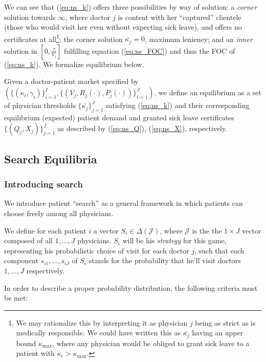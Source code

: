 \documentclass{article}
\begin{document}
We can see that (\ref{eq:ns_k}) offers three possibilities by way of solution: a \textit{corner} solution towards $\infty$, where doctor $j$ is content with her ``captured'' clientele (those who would visit her even without expecting sick leave), and offers no certificates at all\footnote{We may rationalize this by interpreting it as physician $j$ being as strict as is medically responsible. We could have written this as $\bar{\kappa_j}$ having an upper bound $\kappa_{\operatorname{max}}$, where any physician would be obliged to grant sick leave to a patient with $\kappa_i > \kappa_{\operatorname{max}}$.}; the corner solution $\bar{\kappa_j} = 0$, maximum leniency; and an \textit{inner} solution in $[0,\frac{\tau}{V_j}]$ fulfilling equation (\ref{eq:ns_FOC}) and thus the FOC of (\ref{eq:ns_k}). We formalize equilibrium below.

\begin{equilibrium}
    \label{ns_eq}
Given a doctor-patient market specified by $(\{(\kappa_i,\gamma_i)\}_{i =1}^{I},\{(V_j,R_j(\cdot),P_j(\cdot))\}_{i =1}^{J})$, we define an equilibrium as a set of physician thresholds $\{\bar{\kappa_j}\}_{j =1}^{J}$ satisfying (\ref{eq:ns_k}) and their corresponding equilibrium (expected) patient demand and granted sick leave certificates $\{(Q_j,X_j)\}_{j =1}^{J}$ as described by (\ref{eq:ns_Q}), (\ref{eq:ns_X}), respectively.
\end{equilibrium}

\subsection{Search Equilibria}

\subsubsection{Introducing search}

We introduce patient ``search'' as a general framework in which patients can choose freely among all physicians.

We define for each patient $i$ a vector $S_i \in \Delta(\mathcal{J})$, where $\mathcal{J}$ is the the $1 \times J$ vector composed of all $1, ..., J$ physicians. $S_i$ will be his \textit{strategy} for this game, representing his probabilistic choice of visit for each doctor $j$, such that each component $s_{i1}, ... , s_{iJ}$ of $S_i$ stands for the probability that he'll visit doctors $1, ..., J$ respectively.

In order to describe a proper probability distribution, the following criteria must be met:
\end{document}
